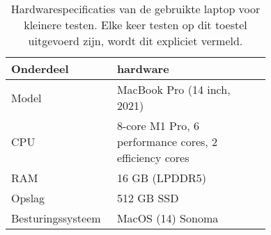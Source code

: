 \begin{table}[ht]
    \centering
    \begin{tabular}{p{0.20\linewidth}p{0.54\linewidth}}
        Onderdeel         & hardware                                               \\
        \hline\hline
        Model             & MacBook Pro (14 inch, 2021)                            \\
        CPU               & 8-core M1 Pro, 6 performance cores, 2 efficiency cores \\
        RAM               & 16 GB (LPDDR5)                                         \\
        Opslag            & 512 GB SSD                                             \\
        Besturingssysteem & MacOS (14) Sonoma                                      \\
        \hline
    \end{tabular}
    \caption{Hardwarespecificaties van de gebruikte laptop voor kleinere testen. Elke keer testen op dit toestel uitgevoerd zijn, wordt dit expliciet vermeld.}
    \label{tab:macbook_hardware}
\end{table}